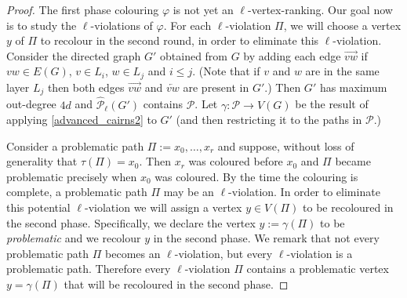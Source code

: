 \documentclass{patmorin}
\newcommand{\defin}[1]{\emph{\color{brightmaroon}#1}}
\begin{document}
\begin{proof}
  The first phase colouring $\varphi$ is not yet an $\ell$-vertex-ranking.  Our goal now is to study the $\ell$-violations of $\varphi$.  For each $\ell$-violation $\Pi$, we will choose a vertex $y$ of $\Pi$ to recolour in the second round, in order to eliminate this $\ell$-violation.  Consider the directed graph $G'$ obtained from $G$ by adding each edge $\overrightarrow{vw}$ if $vw\in E(G)$, $v\in L_i$, $w\in L_j$ and $i\le j$.  (Note that if $v$ and $w$ are in the same layer $L_j$ then both edges $\overrightarrow{vw}$ and $\overleftarrow{vw}$ are present in $G'$.)  Then $G'$ has maximum out-degree $4d$ and $\widehat{\mathcal{P}}_\ell(G')$ contains $\mathcal{P}$. Let $\gamma:\mathcal{P}\to V(G)$ be the result of applying \cref{advanced_cairns2} to $G'$ (and then restricting it to the paths in $\mathcal{P}$.)

  Consider a problematic path $\Pi:=x_0,\ldots,x_r$ and suppose, without loss of generality that $\tau(\Pi)=x_0$.  Then $x_r$ was coloured before $x_0$ and $\Pi$ became problematic precisely when $x_0$ was coloured.
  By the time the colouring is complete, a problematic path $\Pi$ may be an $\ell$-violation.  In order to eliminate this potential $\ell$-violation we will assign a vertex $y\in V(\Pi)$ to be recoloured in the second phase.  Specifically, we declare the vertex $y:=\gamma(\Pi)$ to be \defin{problematic} and we recolour $y$ in the second phase.  We remark that not every problematic path $\Pi$ becomes an $\ell$-violation, but every $\ell$-violation is a problematic path.  Therefore every $\ell$-violation $\Pi$ contains a problematic vertex $y=\gamma(\Pi)$ that will be recoloured in the second phase.



\end{proof}
\end{document}
